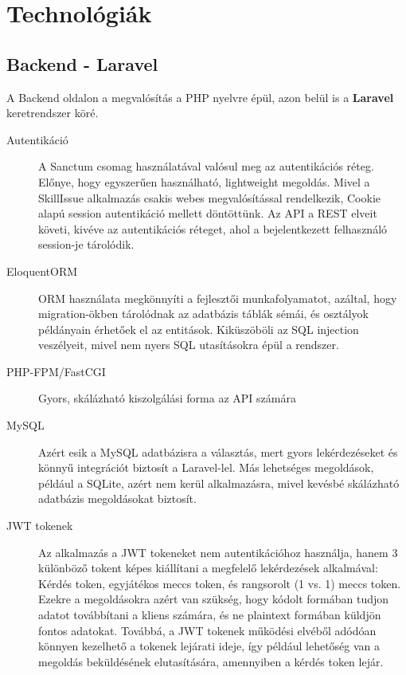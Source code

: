 \chapter{Technológiák}

\section{Backend - Laravel}
A Backend oldalon a megvalósítás a PHP nyelvre épül, azon belül is a \textbf{Laravel} keretrendszer köré.

\begin{description}
    \item[Autentikáció]A Sanctum csomag használatával valósul meg az autentikációs réteg. Előnye, hogy egyszerűen használható, lightweight megoldás. Mivel a SkillIssue alkalmazás csakis webes megvalósítással rendelkezik, Cookie alapú session autentikáció mellett döntöttünk. Az API a REST elveit követi, kivéve az autentikációs réteget, ahol a bejelentkezett felhasználó session-je
    tárolódik.
    \item[EloquentORM]ORM használata megkönnyíti a fejlesztői munkafolyamatot, azáltal, hogy migration-ökben tárolódnak az adatbázis táblák sémái, és osztályok példányain érhetőek el az entitások. Kiküszöböli az SQL injection veszélyeit, mivel nem nyers SQL utasításokra épül a rendszer.
    \item[PHP-FPM/FastCGI]Gyors, skálázható kiszolgálási forma az API számára
    \item[MySQL]Azért esik a MySQL adatbázisra a választás, mert gyors lekérdezéseket és könnyű integrációt biztosít a Laravel-lel. Más lehetséges megoldások, például a SQLite, azért nem kerül alkalmazásra, mivel kevésbé skálázható adatbázis megoldásokat biztosít.
    \item[JWT tokenek]Az alkalmazás a JWT tokeneket nem autentikációhoz használja, hanem 3 különböző tokent képes kiállítani a megfelelő lekérdezések alkalmával: Kérdés token, egyjátékos meccs token, és rangsorolt (1 vs. 1) meccs token. Ezekre a megoldásokra azért van szükség, hogy kódolt formában tudjon adatot továbbítani a kliens számára, és ne plaintext formában küldjön fontos adatokat. Továbbá, a JWT tokenek működési elvéből adódóan könnyen kezelhető a tokenek lejárati ideje, így például lehetőség van a megoldás beküldésének elutasítására, amennyiben a kérdés token lejár.
    
\end{description}

\newpage

